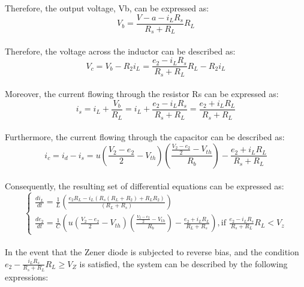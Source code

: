 Therefore, the output voltage, Vb, can be expressed as:\\

\begin{equation}
    V_b=\frac{V-a-i_LR_s}{R_s+R_L}R_L
\end{equation}\\

Therefore, the voltage across the inductor can be described as:\\

\begin{equation}
    V_c=V_b-R_2i_L=\frac{e_2-i_LR_s}{R_s+R_L}R_L-R_2i_L
\end{equation}\\

Moreover, the current flowing through the resistor Rs can be expressed as:\\

\begin{equation}
    i_s=i_L+\frac{V_b}{R_L}=i_L+\frac{e_2-i_LR_s}{R_s+R_L}=\frac{e_2+i_LR_L}{R_s+R_L}
\end{equation}\\

Furthermore, the current flowing through the capacitor can be described as:\\

\begin{equation}
    i_c=i_d-i_s=u(\frac{V_2-e_2}{2}-V_{th})(\frac{\frac{V_2-e_2}{2}-V_{th}}{R_b})-\frac{e_2+i_LR_L}{R_s+R_L}
\end{equation}\\

Consequently, the resulting set of differential equations can be expressed as:\\

\begin{equation}
    \begin{cases}
        \frac{di_L}{dt}=\frac{1}{L}(\frac{e_2R_L-i_L(R_s(R_L+R_2)+R_LR_2)}{(R_L+R_s)})\\
        \frac{de_2}{dt}=\frac{1}{C}(u(\frac{V_2-e_2}{2}-V_{th})(\frac{\frac{V_2-e_2}{2}-V_{th}}{R_b})-\frac{e_2+i_LR_L}{R_L+R_s}),  \text{if } \frac{e_2-i_LR_s}{R_s+R_L}R_L<V_z
    \end{cases}
\end{equation}\\

In the event that the Zener diode is subjected to reverse bias, and the condition $e_2 - \frac{i_L R_s}{R_s+R_L} R_L \geq V_Z$ is satisfied, the system can be described by the following expressions:\\

